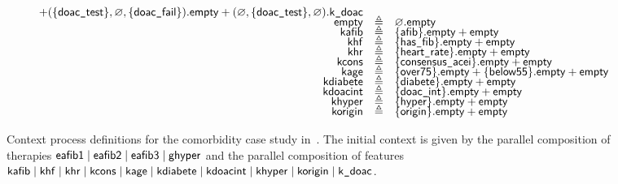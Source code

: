 \begin{figure}[t]
\[\begin{array}{rcl}
+ (\{\mathsf{doac}\texttt{\_}\mathsf{test}\},\varnothing,\{\mathsf{doac}\texttt{\_}\mathsf{fail}\}).\mathsf{empty}
+ (\varnothing,\{\mathsf{doac}\texttt{\_}\mathsf{test}\},\varnothing).\mathsf{k}\texttt{\_}\mathsf{doac}
\\[-4pt]
\mathsf{empty} &  \triangleq 
& \varnothing.\mathsf{empty}
\\[-4pt]
\mathsf{kafib} &  \triangleq 
& \{\mathsf{afib}\}.\mathsf{empty} + \mathsf{empty}
\\[-4pt]
\mathsf{khf} &  \triangleq 
& \{\mathsf{has}\texttt{\_}\mathsf{fib}\}.\mathsf{empty} + \mathsf{empty}
\\[-4pt]
\mathsf{khr} &  \triangleq 
& \{\mathsf{heart}\texttt{\_}\mathsf{rate}\}.\mathsf{empty} + \mathsf{empty}
\\[-4pt]
\mathsf{kcons} &  \triangleq 
& \{\mathsf{consensus}\texttt{\_}\mathsf{acei}\}.\mathsf{empty} + \mathsf{empty}
\\[-4pt]
\mathsf{kage} &  \triangleq 
& \{\mathsf{over75}\}.\mathsf{empty} + \{\mathsf{below55}\}.\mathsf{empty} + \mathsf{empty}
\\[-4pt]
\mathsf{kdiabete} &  \triangleq 
& \{\mathsf{diabete}\}.\mathsf{empty} + \mathsf{empty}
\\[-4pt]
\mathsf{kdoacint} &  \triangleq 
& \{\mathsf{doac}\texttt{\_}\mathsf{int}\}.\mathsf{empty} + \mathsf{empty}
\\[-4pt]
\mathsf{khyper} &  \triangleq 
& \{\mathsf{hyper}\}.\mathsf{empty} + \mathsf{empty}
\\[-4pt]
\mathsf{korigin} &  \triangleq 
& \{\mathsf{origin}\}.\mathsf{empty} + \mathsf{empty}
\end{array}
\]
\normalsize
\caption{Context process definitions for the comorbidity case study in~.
The initial context is given by the parallel composition of therapies 
$\mathsf{eafib1}
\mid \mathsf{eafib2}
\mid \mathsf{eafib3}
\mid \mathsf{ghyper}$ and the parallel composition of features
$\mathsf{kafib}
\mid \mathsf{khf}
\mid \mathsf{khr}
\mid \mathsf{kcons}
\mid \mathsf{kage}
\mid \mathsf{kdiabete}
\mid \mathsf{kdoacint}
\mid \mathsf{khyper}
\mid \mathsf{korigin}
\mid \mathsf{k}\texttt{\_}\mathsf{doac}$.}
\label{fig:bioresolve:comorbidities:contexts}
\end{figure}
%
